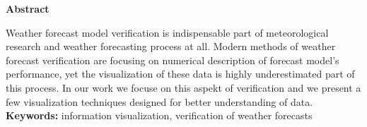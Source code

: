 
\begin{Huge}
\textbf{Abstract}  \\
\end{Huge}

Weather forecast model verification is indispensable part of meteorological research and weather forecasting process at all. Modern methods of weather forecast verification are focusing on numerical description of forecast model's performance, yet the visualization of these data is highly underestimated part of this process. In our work we focuse on this aspekt of verification and we present a few visualization techniques designed for better understanding of data. \\


\noindent\textbf{Keywords:} information visualization, verification of weather forecasts